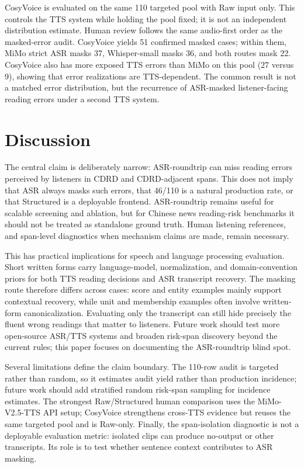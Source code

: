 \documentclass{article}
\begin{document}
CosyVoice is evaluated on the same 110 targeted pool with Raw input only. This controls the TTS system while holding the pool fixed; it is not an independent distribution estimate. Human review follows the same audio-first order as the masked-error audit. CosyVoice yields 51 confirmed masked cases; within them, MiMo strict ASR masks 37, Whisper-small masks 36, and both routes mask 22. CosyVoice also has more exposed TTS errors than MiMo on this pool (27 versus 9), showing that error realizations are TTS-dependent. The common result is not a matched error distribution, but the recurrence of ASR-masked listener-facing reading errors under a second TTS system.

\section{Discussion}

The central claim is deliberately narrow: ASR-roundtrip can miss reading errors perceived by listeners in CDRD and CDRD-adjacent spans. This does not imply that ASR always masks such errors, that 46/110 is a natural production rate, or that Structured is a deployable frontend. ASR-roundtrip remains useful for scalable screening and ablation, but for Chinese news reading-risk benchmarks it should not be treated as standalone ground truth. Human listening references, and span-level diagnostics when mechanism claims are made, remain necessary.

This has practical implications for speech and language processing evaluation. Short written forms carry language-model, normalization, and domain-convention priors for both TTS reading decisions and ASR transcript recovery. The masking route therefore differs across cases: score and entity examples mainly support contextual recovery, while unit and membership examples often involve written-form canonicalization. Evaluating only the transcript can still hide precisely the fluent wrong readings that matter to listeners. Future work should test more open-source ASR/TTS systems and broaden risk-span discovery beyond the current rules; this paper focuses on documenting the ASR-roundtrip blind spot.

Several limitations define the claim boundary. The 110-row audit is targeted rather than random, so it estimates audit yield rather than production incidence; future work should add stratified random risk-span sampling for incidence estimates. The strongest Raw/Structured human comparison uses the MiMo-V2.5-TTS API setup; CosyVoice strengthens cross-TTS evidence but reuses the same targeted pool and is Raw-only. Finally, the span-isolation diagnostic is not a deployable evaluation metric: isolated clips can produce no-output or other transcripts. Its role is to test whether sentence context contributes to ASR masking.
\end{document}
